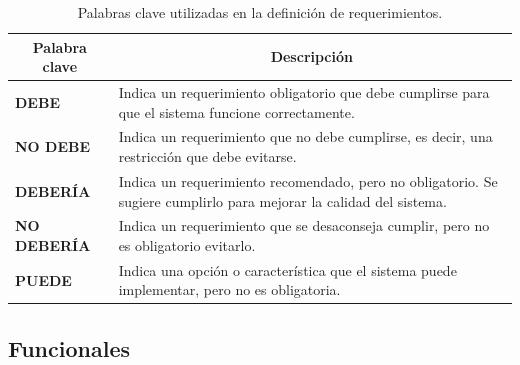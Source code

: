 \begin{table}[h!]
    \centering
    \begin{tabular}{|l|p{10cm}|}
        \hline
        \multicolumn{1}{|c|}{\textbf{Palabra clave}} & \multicolumn{1}{c|}{\textbf{Descripción}} \\
        \hline
        \textbf{DEBE} & Indica un requerimiento obligatorio que debe cumplirse para que el sistema funcione correctamente. \\
        \hline
        \textbf{NO DEBE} & Indica un requerimiento que no debe cumplirse, es decir, una restricción que debe evitarse. \\
        \hline
        \textbf{DEBERÍA} & Indica un requerimiento recomendado, pero no obligatorio. Se sugiere cumplirlo para mejorar la calidad del sistema. \\
        \hline
        \textbf{NO DEBERÍA} & Indica un requerimiento que se desaconseja cumplir, pero no es obligatorio evitarlo. \\
        \hline
        \textbf{PUEDE} & Indica una opción o característica que el sistema puede implementar, pero no es obligatoria. \\
        \hline
    \end{tabular}
    \caption{Palabras clave utilizadas en la definición de requerimientos.}
    \label{tab:palabras_clave_requerimientos}
\end{table}


\subsection{Funcionales}

